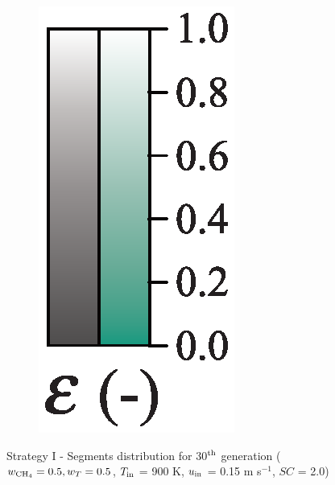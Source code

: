\documentclass[preprint,12pt]{elsarticle}
\begin{document}
\begin{figure}[h!]
\begin{subfigure}[b]{0.1\textwidth}
     	\includegraphics[width=\textwidth]{segments_porosity.eps}
     \end{subfigure}
\caption{\label{fig:30L5050-seg} Strategy I - Segments distribution for 30$^{\rm{th}}$ generation ($w_{\rm{CH_4}} = 0.5, w_T = 0.5$, $T_{\rm{in}}$ = 900 K, $u_{\rm{in}}$ = 0.15 m s$^{-1}$, $SC$ = 2.0)}
\end{figure}
\end{document}
